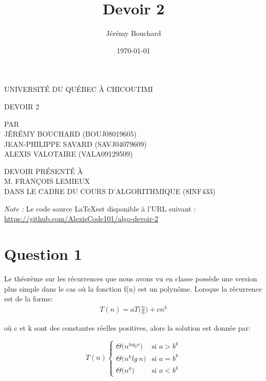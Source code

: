 \documentclass[12pt]{article}
\title{Devoir 2}
\author{Jérémy Bouchard}
\date{\today}
\begin{document}
\begin{titlepage}
	\doublespacing
	\centering
	
	UNIVERSITÉ DU QUÉBEC À CHICOUTIMI \\
	
	\vspace{4.7cm}
	
	DEVOIR 2 \\
	
	\vspace{4.7cm}
	
	PAR \\
	JÉRÉMY BOUCHARD (BOUJ08019605) \\
	JEAN-PHILIPPE SAVARD (SAVJ04079609) \\
	ALEXIS VALOTAIRE (VALA09129509) \\
	
	\vspace{4.7cm}
	
	DEVOIR PRÉSENTÉ À \\
	M. FRANÇOIS LEMIEUX \\
	DANS LE CADRE DU COURS D'ALGORITHMIQUE (8INF433)
\end{titlepage}

\newpage

\textit{Note :} Le code source \LaTeX \:est disponible à l'URL suivant : \\ 
\url{https://github.com/AlexisCode101/algo-devoir-2}

\newpage

\onehalfspacing

\section*{Question 1}
Le théorème sur les récurrences que nous avons vu en classe possède
une version plus simple dans le cas où la fonction f(n) est un polynôme.
Lorsque la récurrence est de la forme:
\begin{align*}
	T(n) = aT\Big(\frac{n}{b}\Big) + cn^k
\end{align*}

où c et k sont des constantes réelles positives, alors la solution est
donnée par:

\[T(n) \begin{cases} 
      \Theta\big(n^{log_ba}\big) & \text{si } a>b^k \\
      \Theta\big(n^klg \: n\big) & \text{si } a=b^k \\
      \Theta\big(n^k\big) & \text{si } a<b^k
   \end{cases}
\]	
\end{document}
